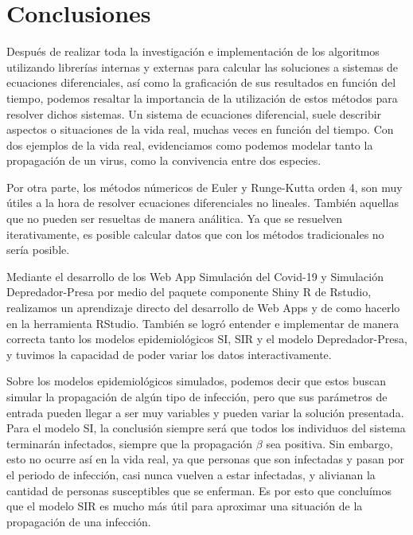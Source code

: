 \documentclass[a4paper,12pt]{article}
\begin{document}
\newpage


\section{Conclusiones}

Después de realizar toda la investigación e implementación de los algoritmos utilizando librerías internas y externas para calcular las soluciones a sistemas de ecuaciones diferenciales, así como la graficación de sus resultados en función del tiempo, podemos resaltar la importancia de la utilización de estos métodos para resolver dichos sistemas. Un sistema de ecuaciones diferencial, suele describir aspectos o situaciones de la vida real, muchas veces en función del tiempo. Con dos ejemplos de la vida real, evidenciamos como podemos modelar tanto la propagación de un virus, como la convivencia entre dos especies. \par

Por otra parte, los métodos númericos de Euler y Runge-Kutta orden 4, son muy útiles a la hora de resolver ecuaciones diferenciales no lineales. También aquellas que no pueden ser resueltas de manera análitica. Ya que se resuelven iterativamente, es posible calcular datos que con los métodos tradicionales no sería posible. \par

Mediante el desarrollo de los Web App Simulación del Covid-19 y Simulación Depredador-Presa por medio del paquete componente Shiny R de Rstudio, realizamos un aprendizaje directo del desarrollo de Web Apps y de como hacerlo en la herramienta RStudio. También se logró entender e implementar de manera correcta tanto los modelos epidemiológicos SI, SIR y el modelo Depredador-Presa, y tuvimos la capacidad de poder variar los datos interactivamente. \par

Sobre los modelos epidemiológicos simulados, podemos decir que estos buscan simular la propagación de algún tipo de infección, pero que sus parámetros de entrada pueden llegar a ser muy variables y pueden variar la solución presentada. Para el modelo SI, la conclusión siempre será que todos los individuos del sistema terminarán infectados, siempre que la propagación $\beta$ sea positiva. Sin embargo, esto no ocurre así en la vida real, ya que personas que son infectadas y pasan por el periodo de infección, casi nunca vuelven a estar infectadas, y alivianan la cantidad de personas susceptibles que se enferman. Es por esto que concluímos que el modelo SIR es mucho más útil para aproximar una situación de la propagación de una infección. \par
\end{document}
